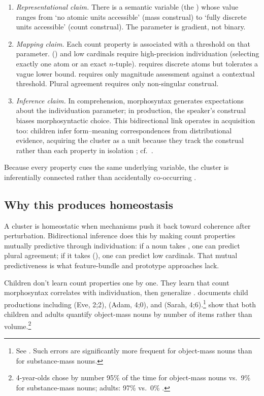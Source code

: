 \documentclass[12pt,a4paper]{article}
\begin{document}
\begin{enumerate}
\item \textit{Representational claim.} There is a semantic variable (the ) whose value ranges from `no atomic units accessible' (mass construal) to `fully discrete units accessible' (count construal). The parameter is gradient, not binary.

\item \textit{Mapping claim.} Each count property is associated with a threshold on that parameter. () and low cardinals require high-precision individuation (selecting exactly one atom or an exact $n$-tuple).  requires discrete atoms but tolerates a vague lower bound.  requires only magnitude assessment against a contextual threshold. Plural agreement requires only non-singular construal.

\item \textit{Inference claim.} In comprehension, morphosyntax generates expectations about the individuation parameter; in production, the speaker's construal biases morphosyntactic choice. This bidirectional link operates in acquisition too: children infer form--meaning correspondences from distributional evidence, acquiring the cluster as a unit because they track the construal rather than each property in isolation \citep{bybee2010}; cf.\ \textcite{tomasello2003}.
\end{enumerate}

Because every property cues the same underlying variable, the cluster is inferentially connected rather than accidentally co-occurring \citep{boyd1991,khalidi2013}.

\subsection{Why this produces homeostasis}

A cluster is homeostatic when mechanisms push it back toward coherence after perturbation. Bidirectional inference does this by making count properties mutually predictive through individuation: if a noun takes , one can predict plural agreement; if it takes (), one can predict low cardinals. That mutual predictiveness is what feature-bundle and prototype approaches lack.

Children don't learn count properties one by one. They learn that count morphosyntax correlates with individuation, then generalize \citep{gordon1985,gordon1988,bloom1994a,barner2005}. \textcite{bloom1994a} documents child productions including  (Eve, 2;2),  (Adam, 4;0), and  (Sarah, 4;6).\footnote{See \textcite[Table~3.2, pp.~59--60]{bloom1994a}. Such errors are significantly more frequent for object-mass nouns than for substance-mass nouns.} \textcite{barner2005} show that both children and adults quantify object-mass nouns by number of items rather than volume.\footnote{4-year-olds chose by number 95\% of the time for object-mass nouns vs.\ 9\% for substance-mass nouns; adults: 97\% vs.\ 0\% \citep[pp.~50--51]{barner2005}.}
\end{document}

